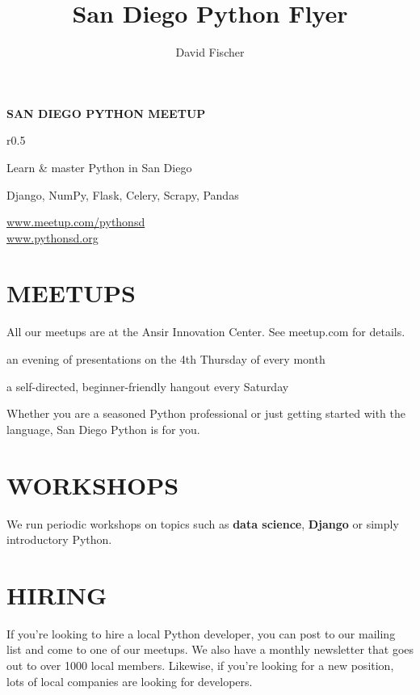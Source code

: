 \documentclass[letterpaper,12pt]{article}
\title{San Diego Python Flyer}
\author{David Fischer}
\begin{document}
  {\huge \textbf{SAN DIEGO PYTHON MEETUP}}
  \vspace{8pt}

  \begin{wrapfigure}{r}{0.5\textwidth}
  	\vspace{-80pt}
    \centering
    \def\svgwidth{0.45\columnwidth}
    
    \vspace{-120pt}
  \end{wrapfigure}

  {\large
  	Learn \& master Python in San Diego

	\vspace{10pt}

	Django, NumPy, Flask, Celery, Scrapy, Pandas

	\vspace{10pt}

    \url{www.meetup.com/pythonsd} \\
    \url{www.pythonsd.org}
  }


  \section*{MEETUPS}
  All our meetups are at the Ansir Innovation Center. See meetup.com for details.
  \begin{description}
    {\setlength\itemindent{-0.2in} \item[Monthly Meetup]  an evening of presentations on the 4th Thursday of every month}
    {\setlength\itemindent{-0.2in} \item[Saturday Study Group] a self-directed, beginner-friendly hangout every Saturday}
  \end{description}
  Whether you are a seasoned Python professional or just getting started
  with the language, San Diego Python is for you.


  \section*{WORKSHOPS}
  We run periodic workshops on topics such as \textbf{data science}, \textbf{Django}
  or simply introductory Python.


  \section*{HIRING}
  If you're looking to hire a local Python developer, you can post to our mailing
  list and come to one of our meetups. We also have a monthly newsletter that goes
  out to over 1000 local members. Likewise, if you're looking for a new position,
  lots of local companies are looking for developers.
\end{document}
